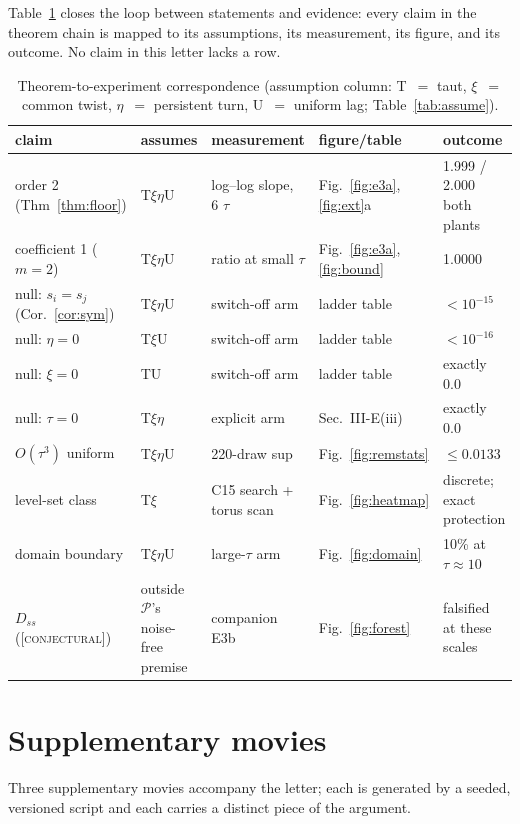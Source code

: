 \documentclass[letterpaper, 10pt, journal]{IEEEtran}
\newcommand{\conjtag}{\textsc{[conjectural]}}
\begin{document}
Table~\ref{tab:corr} closes the loop between statements and evidence: every
claim in the theorem chain is mapped to its assumptions, its measurement, its
figure, and its outcome. No claim in this letter lacks a row.

\begin{table}[t]
\centering
\caption{Theorem-to-experiment correspondence (assumption column:
T~$=$ taut, $\xi$~$=$ common twist, $\eta$~$=$ persistent turn,
U~$=$ uniform lag; Table~\ref{tab:assume}).}
\label{tab:corr}
\begin{tabular}{p{1.75cm}p{0.7cm}p{1.5cm}p{1.7cm}p{1.35cm}}
\toprule
claim & assumes & measurement & figure/table & outcome \\
\midrule
order 2 (Thm~\ref{thm:floor}) & T$\xi\eta$U & log--log slope, 6 $\tau$ &
Fig.~\ref{fig:e3a}, \ref{fig:ext}a & 1.999 / 2.000 both plants \\
coefficient 1 ($m{=}2$) & T$\xi\eta$U & ratio at small $\tau$ &
Fig.~\ref{fig:e3a}, \ref{fig:bound} & 1.0000 \\
null: $s_i{=}s_j$ (Cor.~\ref{cor:sym}) & T$\xi\eta$U & switch-off arm &
ladder table & $<10^{-15}$ \\
null: $\eta{=}0$ & T$\xi$U & switch-off arm & ladder table & $<10^{-16}$ \\
null: $\xi{=}0$ & TU & switch-off arm & ladder table & exactly $0.0$ \\
null: $\tau{=}0$ & T$\xi\eta$ & explicit arm & Sec.~III-E(iii) & exactly
$0.0$ \\
$O(\tau^3)$ uniform & T$\xi\eta$U & 220-draw sup & Fig.~\ref{fig:remstats} &
$\le 0.0133$ \\
level-set class & T$\xi$ & C15 search + torus scan & Fig.~\ref{fig:heatmap}
& discrete; exact protection \\
domain boundary & T$\xi\eta$U & large-$\tau$ arm & Fig.~\ref{fig:domain} &
10\% at $\tau{\approx}10$ \\
$D_{ss}$ (\conjtag) & outside $\mathcal{P}$'s noise-free premise & companion
E3b & Fig.~\ref{fig:forest} & falsified at these scales \\
\bottomrule
\end{tabular}
\end{table}

\section{Supplementary movies}
Three supplementary movies accompany the letter; each is generated by a
seeded, versioned script and each carries a distinct piece of the argument.
\end{document}
